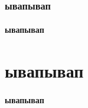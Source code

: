 \documentclass[paper=a4, fontsize=14pt, pagesize, DIV=calc, oneside]{scrreport}
\begin{document}









\subsection{ывапывап}














\subsubsection{ывапывап}






\chapter{ывапывап}


















\subsubsection{ывапывап}



\end{document}
